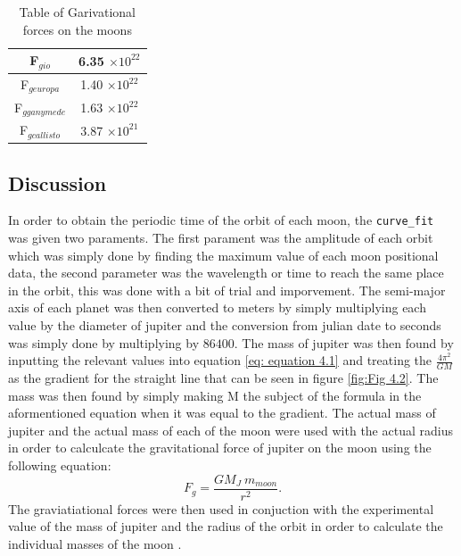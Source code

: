\documentclass[12pt, a4paper]{article}
\begin{document}
\begin{table}[H]
    \centering
    \begin{tabular}{|c|c|}
    \hline
    F\(_{g io}\) & 6.35 \(\times 10^{22}\) \\ \hline
    F\(_{g europa}\) & 1.40 \(\times 10^{22}\) \\ \hline
    F\(_{g ganymede}\) & 1.63 \(\times 10^{22}\) \\ \hline
    F\(_{g callisto}\) & 3.87 \(\times 10^{21}\) \\ \hline
    \end{tabular}
    \caption{Table of Garivational forces on the moons}
    \label{tab: Table 4.3}
\end{table}

\subsection{Discussion}
In order to obtain the periodic time of the orbit of each moon, the \texttt{curve_fit} was given two paraments. The first parament was the amplitude of each orbit which was simply done by finding the maximum value of each moon positional data, the second parameter was the wavelength or time to reach the same place in the orbit, this was done with a bit of trial and imporvement. The semi-major axis of each planet was then converted to meters by simply multiplying each value by the diameter of jupiter and the conversion from julian date to seconds was simply done by multiplying by \(86400\). The mass of jupiter was then found by inputting the relevant values into equation \ref{eq: equation 4.1} and treating the \(\frac{4\pi^2}{GM}\) as the gradient for the straight line that can be seen in figure \ref{fig:Fig 4.2}. The mass was then found by simply making M the subject of the formula in the aformentioned equation when it was equal to the gradient. The actual mass of jupiter and the actual mass of each of the moon were used with the actual radius in order to calculcate the gravitational force of jupiter on the moon using the following equation:
\begin{equation}
    F_g = \frac{GM_J~m_{moon}}{r^2} .
\end{equation}
The graviatiational forces were then used in conjuction with the experimental value of the mass of jupiter and the radius of the orbit in order to calculate the individual masses of the moon \parencite{muncaster}. 
\end{document}
